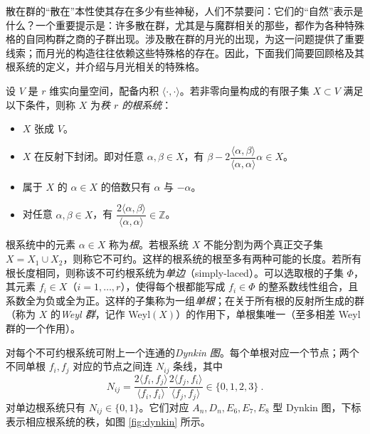 \documentclass[11pt,a4paper,fontset=windows]{ctexart}
\numberwithin{equation}{section}
\newcommand{\ZZ}{\mathbb{Z}}
\def\a{\alpha}
\begin{document}
散在群的“散在”本性使其存在多少有些神秘，人们不禁要问：它们的“自然”表示是什么？一个重要提示是：许多散在群，尤其是与魔群相关的那些，都作为各种特殊格的自同构群之商的子群出现。涉及散在群的月光的出现，为这一问题提供了重要线索；而月光的构造往往依赖这些特殊格的存在。因此，下面我们简要回顾格及其根系统的定义，并介绍与月光相关的特殊格。

设 $V$ 是 $r$ 维实向量空间，配备内积 $\langle\cdot,\cdot\rangle$。若非零向量构成的有限子集 $X\subset V$ 满足以下条件，则称 $X$ 为\emph{秩 $r$ 的根系统}：
\begin{itemize}
\item $X$ 张成 $V$。
\item $X$ 在反射下封闭。即对任意 $\a, \beta\in X$，有 $\beta-2\dfrac{\langle\alpha,\beta\rangle}{\langle\alpha,\alpha\rangle}\alpha \in X$。
\item 属于 $X$ 的 $\alpha\in X$ 的倍数只有 $\alpha$ 与 $-\alpha$。
\item 对任意 $\alpha,\beta\in X$，有 $\dfrac{2\langle\alpha,\beta\rangle}{\langle\alpha,\alpha\rangle}\in\ZZ$。
\end{itemize}
根系统中的元素 $\alpha\in X$ 称为\emph{根}。若根系统 $X$ 不能分割为两个真正交子集 $X=X_1\cup X_2$，则称它不可约。这样的根系统的根至多有两种可能的长度。若所有根长度相同，则称该不可约根系统为\emph{单边}（simply-laced）。可以选取根的子集 $\Phi$，其元素 $f_i\in X$（$i=1,\dots,r$），使得每个根都能写成 $f_i\in\Phi$ 的整系数线性组合，且系数全为负或全为正。这样的子集称为一组\emph{单根}；在关于所有根的反射所生成的群（称为 $X$ 的\emph{Weyl 群}，记作 Weyl$(X)$）的作用下，单根集唯一（至多相差 Weyl 群的一个作用）。

对每个不可约根系统可附上一个连通的\emph{Dynkin 图}。每个单根对应一个节点；两个不同单根 $f_i,f_j$ 对应的节点之间连 $N_{ij}$ 条线，其中
\begin{equation}
N_{ij}=\frac{2\langle f_i,f_j\rangle}{\langle f_i,f_i\rangle}\frac{2\langle f_j,f_i\rangle}{\langle f_j,f_j\rangle}\in\lbrace0,1,2,3\rbrace~.
\end{equation}
对单边根系统只有 $N_{ij}\in\lbrace0,1\rbrace$。它们对应 $A_n,D_n, E_6, E_7, E_8$ 型 Dynkin 图，下标表示相应根系统的秩，如图 \ref{fig:dynkin} 所示。
\end{document}
